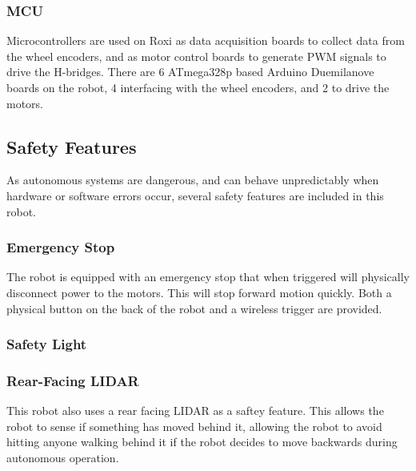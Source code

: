 \subsubsection{MCU}

Microcontrollers are used on Roxi as data acquisition boards to collect data from the wheel encoders, and as motor control boards to generate PWM signals to drive the H-bridges. There are 6 ATmega328p based Arduino Duemilanove boards on the robot, 4 interfacing with the wheel encoders, and 2 to drive the motors.

\subsection{Safety Features}

As autonomous systems are dangerous, and can behave unpredictably when hardware or software errors occur, several safety features are included in this robot.

\subsubsection{Emergency Stop}

The robot is equipped with an emergency stop that when triggered will physically disconnect power to the motors. This will stop forward motion quickly. Both a physical button on the back of the robot and a wireless trigger are provided.

\subsubsection{Safety Light}



\subsubsection{Rear-Facing LIDAR}

This robot also uses a rear facing LIDAR as a saftey feature. This allows the robot to sense if something has moved behind it, allowing the robot to avoid hitting anyone walking behind it if the robot decides to move backwards during autonomous operation.

